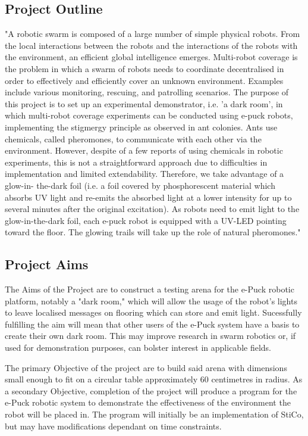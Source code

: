 \subsection{Project Outline} \label{desProOut}
"A robotic swarm is composed of a large number of simple physical robots. From
the local interactions between the robots and the interactions of the robots
with the environment, an efficient global intelligence emerges. Multi-robot
coverage is the problem in which a swarm of robots needs to coordinate
decentralised in order to effectively and efficiently cover an unknown
environment. Examples include various monitoring, rescuing, and patrolling
scenarios. The purpose of this project is to set up an experimental
demonstrator, i.e. 'a dark room', in which multi-robot coverage experiments can
be conducted using e-puck robots, implementing the stigmergy principle as
observed in ant colonies. Ants use chemicals, called pheromones, to communicate
with each other via the environment. However, despite of a few reports of using
chemicals in robotic experiments, this is not a straightforward approach due to
difficulties in implementation and limited extendability. Therefore, we take
advantage of a glow-in- the-dark foil (i.e. a foil covered by phosphorescent
material which absorbs UV light and re-emits the absorbed light at a lower
intensity for up to several minutes after the original excitation). As robots
need to emit light to the glow-in-the-dark foil, each e-puck robot is equipped
with a UV-LED pointing toward the floor. The glowing trails will take up the
role of natural pheromones."

\subsection{Project Aims} \label{desProAim}
The Aims of the Project are to construct a testing arena for the e-Puck robotic 
platform, notably a "dark room," which will allow the usage of the robot's
lights to leave localised messages on flooring which can store and emit light.
Sucessfully fulfilling the aim will mean that other users of the e-Puck system
have a basis to create their own dark room.  This may improve research in swarm
robotics or, if used for demonstration purposes, can bolster interest in
applicable fields.

The primary Objective of the project are to build said arena with dimensions
small enough to fit on a circular table approximately 60 centimetres in radius.
As a secondary Objective, completion of the project will produce a program for
the e-Puck robotic system to demonstrate the effectiveness of the environment the robot will be placed in.  The program will initially be an implementation of
StiCo\cite{Ranjbar-Sahraei2012Demo}, but may have modifications dependant on
time constraints.

